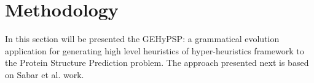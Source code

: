 \documentclass[conference]{IEEEtran}
\begin{document}
%
%
%
%
%	
%	 
% 
%	
%
%	
%


\section{Methodology}
\label{sec:methodology}
In this section will be presented the GEHyPSP: a grammatical evolution application for generating high level heuristics of hyper-heuristics framework to the Protein Structure Prediction problem. The approach presented next is based on Sabar et al. \cite{sabar2015automatic} work. 
\end{document}

